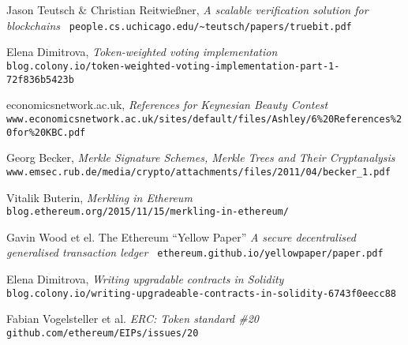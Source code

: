 \begin{thebibliography}{9}
  
  
  Jason Teutsch \& Christian Reitwießner,
  \emph{A scalable verification solution for blockchains}
  \verb| people.cs.uchicago.edu/~teutsch/papers/truebit.pdf |
  
  Elena Dimitrova,
  \emph{Token-weighted voting implementation}
  \verb| blog.colony.io/token-weighted-voting-implementation-part-1-72f836b5423b |
  
  economicsnetwork.ac.uk,
  \emph{References for Keynesian Beauty Contest}
  \verb| www.economicsnetwork.ac.uk/sites/default/files/Ashley/6%20References%20for%20KBC.pdf |

  Georg Becker,
  \emph{Merkle Signature Schemes, Merkle Trees and Their Cryptanalysis}
  \verb| www.emsec.rub.de/media/crypto/attachments/files/2011/04/becker_1.pdf |

  Vitalik Buterin,
  \emph{Merkling in Ethereum}
  \verb| blog.ethereum.org/2015/11/15/merkling-in-ethereum/ |
  
  Gavin Wood et el.
  The Ethereum ``Yellow Paper''
  \emph{A secure decentralised generalised transaction ledger}
  \verb| ethereum.github.io/yellowpaper/paper.pdf |
  
  Elena Dimitrova,
  \emph{Writing upgradable contracts in Solidity}
  \verb| blog.colony.io/writing-upgradeable-contracts-in-solidity-6743f0eecc88 |
  
  Fabian Vogelsteller et al.
  \emph{ERC: Token standard \#20}
  \verb| github.com/ethereum/EIPs/issues/20 |
  
\end{thebibliography}